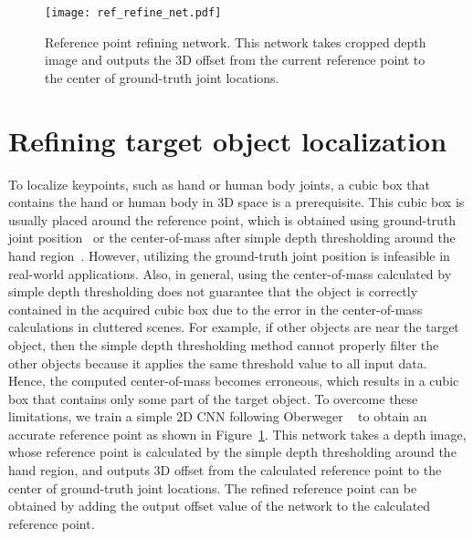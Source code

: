 \documentclass[10pt,twocolumn,letterpaper]{article}
\begin{document}
\begin{figure}[t]
\begin{center}
   \texttt{[image: ref\_refine\_net.pdf]}
\end{center}
\vspace*{-5mm}
   \caption{Reference point refining network. This network takes cropped depth image and outputs the 3D offset from the current reference point to the center of ground-truth joint locations.}
\vspace*{-3mm}
\label{fig:ref_refine_net}
\end{figure}


 \section{Refining target object localization}
\label{refineRefPoint_Section}

To localize keypoints, such as hand or human body joints, a cubic box that contains the hand or human body in 3D space is a prerequisite. This cubic box is usually placed around the reference point, which is obtained using ground-truth joint position~\cite{oberweger2015hands,oberweger2015training,zhou2016model} or the center-of-mass after simple depth thresholding around the hand region~\cite{guo2017ren,guo2017towards,chen2017pose}. However, utilizing the ground-truth joint position is infeasible in real-world applications. Also, in general, using the center-of-mass calculated by simple depth thresholding does not guarantee that the object is correctly contained in the acquired cubic box due to the error in the center-of-mass calculations in cluttered scenes. For example, if other objects are near the target object, then the simple depth thresholding method cannot properly filter the other objects because it applies the same threshold value to all input data. Hence, the computed center-of-mass becomes erroneous, which results in a cubic box that contains only some part of the target object. To overcome these limitations, we train a simple 2D CNN following Oberweger \etal~\cite{Oberweger_2017_ICCV_Workshops} to obtain an accurate reference point as shown in Figure~\ref{fig:ref_refine_net}. This network takes a depth image, whose reference point is calculated by the simple depth thresholding around the hand region, and outputs 3D offset from the calculated reference point to the center of ground-truth joint locations. The refined reference point can be obtained by adding the output offset value of the network to the calculated reference point. 
\end{document}
